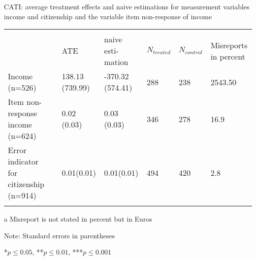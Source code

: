 \begin{threeparttable}[h]
	\centering
	\singlespacing
	\caption{CATI: average treatment effects and naive estimations for measurement variables income and citizenship and the variable item non-response of income}
	\label{tab:inc_and_for}
	\begin{tabularx}{\textwidth}{@{}Xp{0.1cm}p{1.5cm}p{1.5cm}p{1cm}p{1cm}p{1.5cm}}
		&               &     &       &     &    &       \\
		& & ATE & naive \newline esti-mation & \(N_{treated}\) & \(N_{control}\) & Misreports \newline in \newline percent \\
		 \midrule\addlinespace
		Income (n=526)& &138.13 \newline (739.99)    &-370.32 \newline (574.41) &288 & 238 &2543.50\tnote{a}  \\ \addlinespace \addlinespace
		Item non-response income (n=624) &        &0.02 \newline (0.03)    &0.03 \newline (0.03) &346 &278&16.9                 \\  \addlinespace\addlinespace
		Error indicator for citizenship (n=914) & &0.01\newline (0.01)&0.01\newline (0.01)&494&420&2.8 \\ \addlinespace 
		\bottomrule                         
	\end{tabularx}
	\begin{tablenotes}
		\begin{footnotesize}
			\item[a] Misreport is not stated in percent but in Euros
			\item{Note: Standard errors in parentheses}
			\item{*\(p \le 0.05\), **\(p \le 0.01\), ***\(p \le 0.001\)}
		\end{footnotesize}
	\end{tablenotes}
\end{threeparttable}